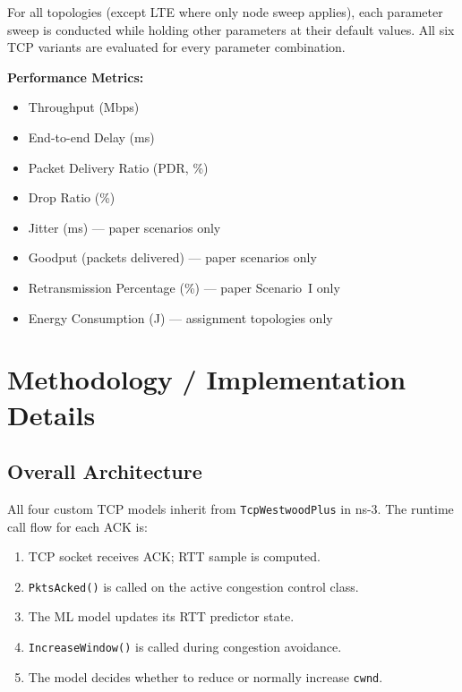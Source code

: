 \documentclass[12pt,a4paper]{article}
\begin{document}
For all topologies (except LTE where only node sweep applies), each parameter sweep is conducted while holding other parameters at their default values. All six TCP variants are evaluated for every parameter combination.

\textbf{Performance Metrics:}
\begin{itemize}[nosep]
    \item Throughput (Mbps)
    \item End-to-end Delay (ms)
    \item Packet Delivery Ratio (PDR, \%)
    \item Drop Ratio (\%)
    \item Jitter (ms) --- paper scenarios only
    \item Goodput (packets delivered) --- paper scenarios only
    \item Retransmission Percentage (\%) --- paper Scenario~I only
    \item Energy Consumption (J) --- assignment topologies only
\end{itemize}

\section{Methodology / Implementation Details}
\label{sec:methodology}

\subsection{Overall Architecture}

All four custom TCP models inherit from \texttt{TcpWestwoodPlus} in ns-3. The runtime call flow for each ACK is:

\begin{enumerate}[nosep]
    \item TCP socket receives ACK; RTT sample is computed.
    \item \texttt{PktsAcked()} is called on the active congestion control class.
    \item The ML model updates its RTT predictor state.
    \item \texttt{IncreaseWindow()} is called during congestion avoidance.
    \item The model decides whether to reduce or normally increase \texttt{cwnd}.
\end{enumerate}
\end{document}
